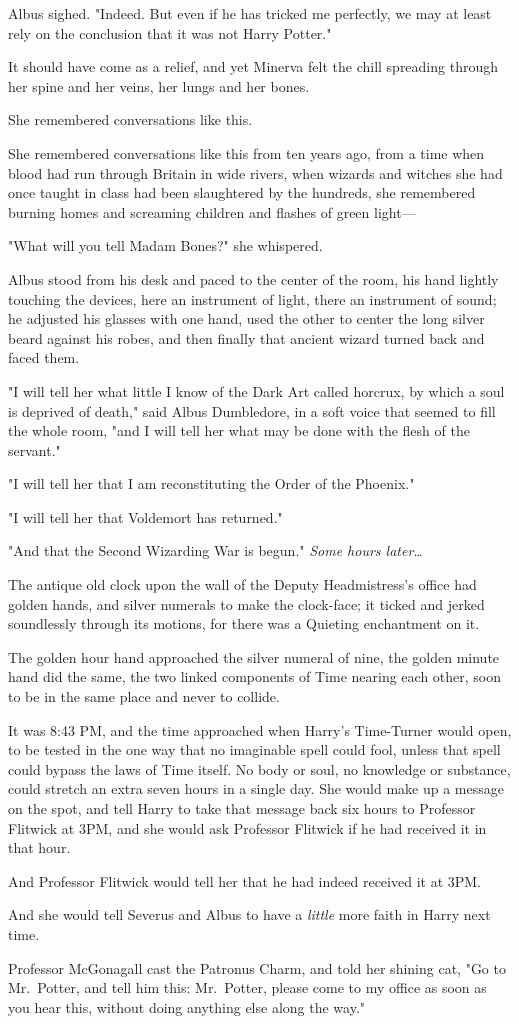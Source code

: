 Albus sighed. "Indeed. But even if he has tricked me perfectly, we may at least 
rely on the conclusion that it was not Harry Potter."

It should have come as a relief, and yet Minerva felt the chill spreading 
through her spine and her veins, her lungs and her bones.

She remembered conversations like this.

She remembered conversations like this from ten years ago, from a time when 
blood had run through Britain in wide rivers, when wizards and witches she had 
once taught in class had been slaughtered by the hundreds, she remembered 
burning homes and screaming children and flashes of green light---

"What will you tell Madam Bones?" she whispered.

Albus stood from his desk and paced to the center of the room, his hand lightly 
touching the devices, here an instrument of light, there an instrument of 
sound; he adjusted his glasses with one hand, used the other to center the long 
silver beard against his robes, and then finally that ancient wizard turned 
back and faced them.

"I will tell her what little I know of the Dark Art called horcrux, by which a 
soul is deprived of death," said Albus Dumbledore, in a soft voice that seemed 
to fill the whole room, "and I will tell her what may be done with the flesh of 
the servant."

"I will tell her that I am reconstituting the Order of the Phoenix."

"I will tell her that Voldemort has returned."

"And that the Second Wizarding War is begun."
\sbreak
\emph{Some hours later{\ldots}}

The antique old clock upon the wall of the Deputy Headmistress's office had 
golden hands, and silver numerals to make the clock-face; it ticked and jerked 
soundlessly through its motions, for there was a Quieting enchantment on it.

The golden hour hand approached the silver numeral of nine, the golden minute 
hand did the same, the two linked components of Time nearing each other, soon 
to be in the same place and never to collide.

It was 8:43 PM, and the time approached when Harry's Time-Turner would open, to 
be tested in the one way that no imaginable spell could fool, unless that spell 
could bypass the laws of Time itself. No body or soul, no knowledge or 
substance, could stretch an extra seven hours in a single day. She would make 
up a message on the spot, and tell Harry to take that message back six hours to 
Professor Flitwick at 3PM, and she would ask Professor Flitwick if he had 
received it in that hour.

And Professor Flitwick would tell her that he had indeed received it at 3PM.

And she would tell Severus and Albus to have a \emph{little} more faith in 
Harry next time.

Professor McGonagall cast the Patronus Charm, and told her shining cat, "Go to 
Mr.~Potter, and tell him this: Mr.~Potter, please come to my office as soon as 
you hear this, without doing anything else along the way."